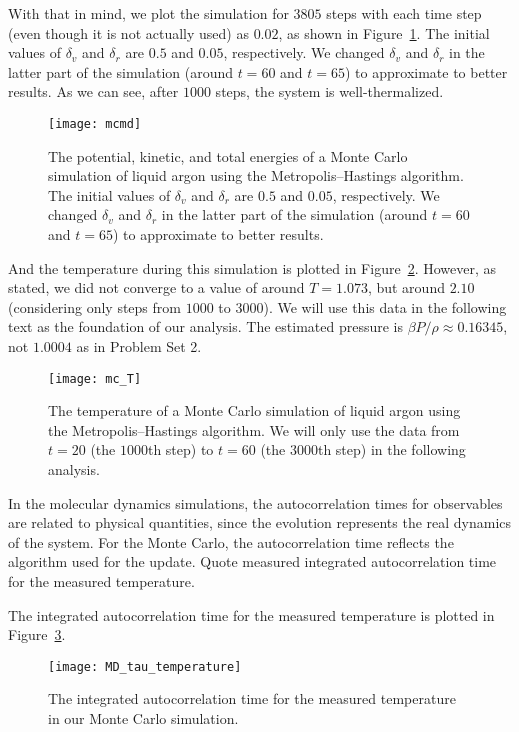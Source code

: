 With that in mind, we plot the simulation for \(3805\) steps with each time step (even
though it is not actually used) as \(0.02\), as shown in Figure~\ref{fig:mcmd}.
The initial values of \(\delta_v\) and \(\delta_r\) are \(0.5\) and \(0.05\),
respectively. We changed \(\delta_v\) and \(\delta_r\) in the latter part of the
simulation (around \(t = 60\) and \(t = 65\)) to approximate to better results.
As we can see, after \(1000\) steps, the system is well-thermalized.
%
\begin{figure}
    \centering
    \texttt{[image: mcmd]}
    \caption{The potential, kinetic, and total energies of a Monte Carlo simulation of
        liquid argon using the Metropolis--Hastings algorithm.
        The initial values of \(\delta_v\) and \(\delta_r\) are \(0.5\) and \(0.05\),
        respectively. We changed \(\delta_v\) and \(\delta_r\) in the latter part of the
        simulation (around \(t = 60\) and \(t = 65\)) to approximate to better results.}
    \label{fig:mcmd}
\end{figure}
%
And the temperature during this simulation is plotted in Figure~\ref{fig:mc_T}.
However, as stated, we did not converge to a value of around \(T = 1.073\), but
around \(2.10\) (considering only steps from \(1000\) to \(3000\)).
We will use this data in the following text as the foundation of our analysis.
The estimated pressure is \(\beta P / \rho \approx 0.16345\), not \(1.0004\)
as in Problem Set 2.

\begin{figure}
    \centering
    \texttt{[image: mc\_T]}
    \caption{The temperature of a Monte Carlo simulation of
        liquid argon using the Metropolis--Hastings algorithm.
        We will only use the data from \(t = 20\) (the \(1000\)th step)
        to \(t = 60\) (the \(3000\)th step) in the following analysis.}
    \label{fig:mc_T}
\end{figure}

\Question{}
In the molecular dynamics simulations, the autocorrelation times for observables are related
to physical quantities, since the evolution represents the real dynamics of the system. For
the Monte Carlo, the autocorrelation time reflects the algorithm used for the update. Quote
measured integrated autocorrelation time for the measured temperature.

\Answer{}
The integrated autocorrelation time for the measured temperature is plotted in
Figure~\ref{fig:MD_tau_temperature}.

\begin{figure}
    \centering
    \texttt{[image: MD\_tau\_temperature]}
    \caption{The integrated autocorrelation time for the measured temperature
        in our Monte Carlo simulation.}
    \label{fig:MD_tau_temperature}
\end{figure}

